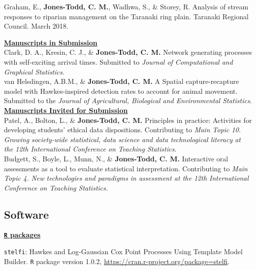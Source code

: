 \documentclass[10pt,a4paper]{moderncv}
\begin{document}
Graham, E., \textbf{Jones-Todd, C. M.}, Wadhwa, S., \& Storey, R. Analysis of stream responses to riparian management on the Taranaki ring plain. Taranaki Regional Council. March 2018.\\

\vspace{2pt}

\underline{\textbf{Manuscripts in Submission}}\\

Clark, D. A., Kresin, C. J., \&  \textbf{Jones-Todd, C. M.} Network generating processes with self-exciting arrival times. Submitted to \textit{Journal of Computational and Graphical Statistics}.\\

 van Helsdingen, A.B.M., \& \textbf{Jones-Todd, C. M.} A Spatial capture-recapture model with Hawkes-inspired detection rates to account for animal movement. Submitted to the \textit{Journal of Agricultural, Biological and Environmental Statistics}.\\

\underline{\textbf{Manuscripts Invited for Submission}}\\

Patel, A., Bolton, L., \& \textbf{Jones-Todd, C. M.} Principles in practice: Activities for developing students' ethical data dispositions. Contributing to \textit{Main Topic 10. Growing society-wide statistical, data science and data technological literacy at the 12th International Conference on Teaching Statistics.}\\

Budgett, S., Boyle, L., Munn, N.,  \& \textbf{Jones-Todd, C. M.} Interactive oral assessments as a tool to evaluate statistical interpretation. Contributing to \textit{Main Topic 4. New technologies and paradigms in assessment at the 12th International Conference on Teaching Statistics.}\\

\vspace{2pt}

\subsection{Software}


\underline{\textbf{\texttt{R} packages}}\\
\vspace{-3pt}

\texttt{stelfi}: Hawkes and Log-Gaussian Cox Point Processes Using Template Model Builder. \texttt{R} package version 1.0.2, \url{https://cran.r-project.org/package=stelfi}.\\
\end{document}
